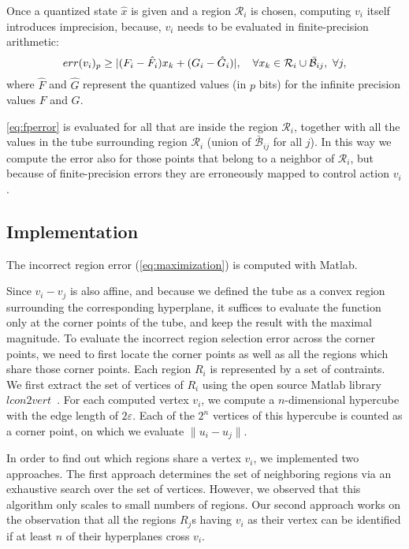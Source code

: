 Once a quantized state $\hat x$ is given and a region $\mathcal R_i$ is chosen, computing $v_{i}$ itself introduces
imprecision, because, $v_{i}$ needs to be evaluated in finite-precision arithmetic:
\begin{equation}\label{eq:fperror}
  err(v_{i})_{p} \ge  | (F_i - \hat{F}_{i}) x_{k} + ( G_i - \hat{G}_{i} ) |,\quad \forall x_{k}\in \mathcal{R}_i\cup\bar{\mathcal B}_{ij},\,\,\forall j,
\end{equation}
where $\hat{F}$ and $\hat{G}$ represent the quantized values (in $p$ bits) for
the infinite precision values $F$ and $G$.

\autoref{eq:fperror} is evaluated for all \statevarmath that are inside the
region $\mathcal{R}_i$, together with all the values in the tube surrounding
region $\mathcal{R}_i$ (union of $\bar{\mathcal B}_{ij}$ for all $j$).
In this way we compute the error also for those points that belong to a neighbor
of $\mathcal{R}_i$, but because of finite-precision errors they are erroneously
mapped to control action $v_{i}$.

\subsection{Implementation}

The incorrect region error (\autoref{eq:maximization}) is computed with Matlab. 

Since $v_{i}-v_{j}$ is also affine, and because we defined the tube as a convex region 
surrounding the corresponding hyperplane, it suffices
to evaluate the function only at the corner points of the tube, and keep the
result with the maximal magnitude. 
To evaluate the incorrect region selection error across
the corner points, we need to first locate the corner points as well as all the
regions which share those corner points. 
Each region $R_i$ is represented by a set of contraints. We first extract the
set of vertices of $R_i$ using the open source Matlab library
$\mathit{lcon2vert}$~\cite{lcon2vertMatlab}.
For each computed vertex $v_i$, we compute a $n$-dimensional
hypercube with the edge length of $2 \varepsilon$. 
Each of the $2^n$ vertices of this hypercube is counted as a corner point, on which
we evaluate $\|u_i - u_j\|$. 

In order to find out which regions share a vertex $v_i$, we implemented two approaches.
The first approach determines the set of neighboring regions via an exhaustive
search over the set of vertices. However, we observed that this algorithm only
scales to small numbers of regions.
Our second approach works on the observation that all the regions $R_j$s 
having $v_i$ as their vertex can be identified if at least $n$ of their hyperplanes cross $v_i$. 

